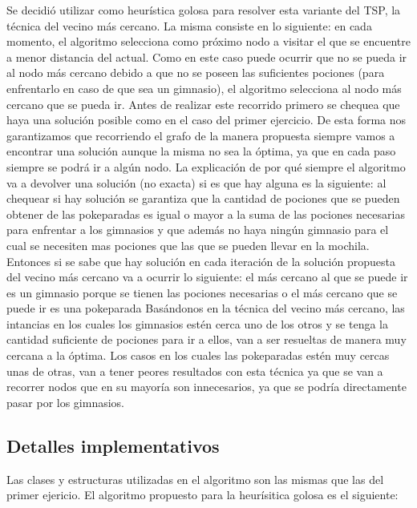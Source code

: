         Se decidió utilizar como heurística golosa para resolver esta variante del TSP, la técnica del vecino más cercano. La misma consiste en lo siguiente: en cada momento, el algoritmo selecciona como próximo nodo a visitar el que se encuentre a menor distancia del actual. Como en este caso puede ocurrir que no se pueda ir al nodo más cercano debido a que no se poseen las suficientes pociones (para enfrentarlo en caso de que sea un gimnasio), el algoritmo selecciona al nodo más cercano que se pueda ir. Antes de realizar este recorrido primero se chequea que haya una solución posible como en el caso del primer ejercicio. De esta forma nos garantizamos que recorriendo el grafo de la manera propuesta siempre vamos a encontrar una solución aunque la misma no sea la óptima, ya que en cada paso siempre se podrá ir a algún nodo. La explicación de por qué siempre el algoritmo va a devolver una solución (no exacta) si es que hay alguna es la siguiente: al chequear si hay solución se garantiza que la cantidad de pociones que se pueden obtener de las pokeparadas es igual o mayor a la suma de las pociones necesarias para enfrentar a los gimnasios y que además no haya ningún gimnasio para el cual se necesiten mas pociones que las que se pueden llevar en la mochila. Entonces si se sabe que hay solución en cada iteración de la solución propuesta del vecino más cercano va a ocurrir lo siguiente: el más cercano al que se puede ir es un gimnasio porque se tienen las pociones necesarias o el más cercano que se puede ir es una pokeparada 
        Basándonos en la técnica del vecino más cercano, las intancias en los cuales los gimnasios estén cerca uno de los otros y se tenga la cantidad suficiente de pociones para ir a ellos, van a ser resueltas de manera muy cercana a la óptima. Los casos en los cuales las pokeparadas estén muy cercas unas de otras, van a tener peores resultados con esta técnica ya que se van a recorrer nodos que en su mayoría son innecesarios, ya que se podría directamente pasar por los gimnasios.

        \subsection{Detalles implementativos}
            Las clases y estructuras utilizadas en el algoritmo son las mismas que las del primer ejericio. El algoritmo propuesto para la heurísitica golosa es el siguiente: 

